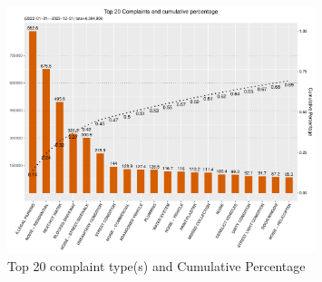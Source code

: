 \documentclass[linenumber]{jdsart}
\begin{document}

\begin{figure}[tbp]
 \centering
  \includegraphics[width=0.8\textwidth]{SR_by_Complaint_Type.pdf} 
  \caption{Top 20 complaint type(s) and Cumulative Percentage} 
  \label{fig:SR_complaints}
\end{figure}
\end{document}
